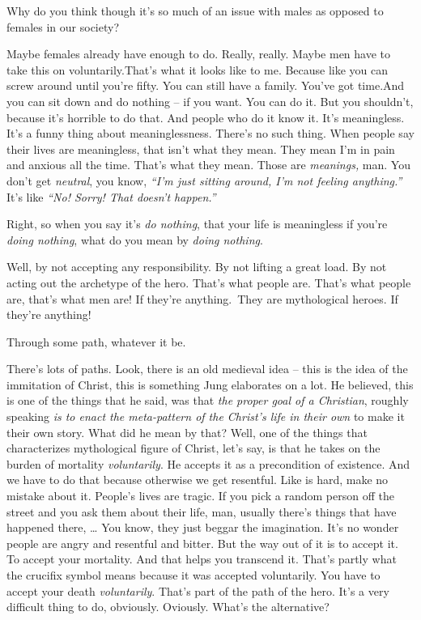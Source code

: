 \documentclass{memoir}
\newcommand{\qq}[1]{\emph{“#1”}}
\begin{document}
\begin{drama}
\jrspeaks Why do you think though it’s so much of an issue with males as opposed to females in our society?

\jpspeaks Maybe females already have enough to do.  Really, really. Maybe men have to take this on voluntarily.That's what it looks like to me. Because like you can screw around until you're fifty. You can still have a family. You've got time.And you can sit down and do nothing -- if you want. You can do it. But you shouldn't, because it's horrible to do that. And people who do it know it. It's meaningless. It's a funny thing about meaninglessness. There's no such thing. When people say their lives are meaningless, that isn't what they mean. They mean I'm in pain and anxious all the time. That's what they mean. Those are \emph{meanings,} man. You don't get \emph{neutral}, you know, \qq{I'm just sitting around, I'm not feeling anything.} It's like \qq{No! Sorry! That doesn't happen.}

\jrspeaks Right, so when you say it's \emph{do nothing}, that your life is meaningless if you're \emph{doing nothing}, what do you mean by \emph{doing nothing}.

\jpspeaks Well, by not accepting any responsibility. By not lifting a great load. By not acting out the archetype of the hero. That's what people are. That's what people are, that's what men are! If they're anything. They are mythological heroes. If they're anything!

\jrspeaks Through some path, whatever it be.

		\jpspeaks There's lots of paths. Look, there is an old medieval idea -- this is the idea of the immitation of Christ, this is something Jung elaborates on a lot. He believed, this is one of the things that he said, was that \emph{the proper goal of a Christian}, roughly speaking \emph{is to enact the meta-pattern of the Christ's life in their own} to make it their own story. What did he mean by that? Well, one of the things that characterizes mythological figure of Christ, let's say, is that he takes on the burden of mortality \emph{voluntarily}. He accepts it as a precondition of existence. And we have to do that because otherwise we get resentful. Like is hard, make no mistake about it. People's lives are tragic. If you pick a random person off the street and you ask them about their life, man, usually there's things that have happened there, \ldots{} You know, they just beggar the imagination. It's no wonder people are angry and resentful and bitter. But the way out of it is to accept it. To accept your mortality. And that helps you transcend it. That's partly what the crucifix symbol means because it was accepted voluntarily. You have to accept your death \emph{voluntarily}. That's part of the path of the hero. It's a very difficult thing to do, obviously. Oviously. What's the alternative?


\end{drama}
\end{document}
